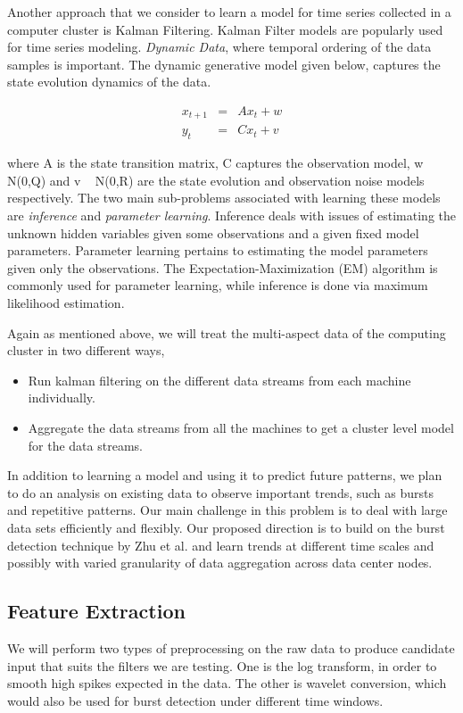 Another approach that we consider to learn a model for time series collected in a computer cluster is Kalman Filtering. Kalman Filter models are popularly used for time series modeling. \emph{Dynamic Data}, where temporal ordering of the data samples is important. The dynamic generative model given below, captures the state evolution dynamics of the data.

\begin{eqnarray}
x_{t+1} &=& Ax_t + w \\
y_t  &=& Cx_t + v
\end{eqnarray}

where A is the state transition matrix, C captures the observation model, w ~ N(0,Q) and v ~ N(0,R) are the state evolution and observation noise models respectively. The two main sub-problems associated with learning these models are \emph{inference} and \emph{parameter learning}. Inference deals with issues of estimating the unknown hidden variables given some observations and a given fixed model parameters. Parameter learning pertains to estimating the model parameters given only the  observations. The Expectation-Maximization (EM) algorithm is commonly used for parameter learning, while inference is done via maximum likelihood estimation.

Again as mentioned above, we will treat the multi-aspect data of the computing cluster in two different ways,

\begin{itemize}
\item Run kalman filtering on the different data streams from each machine individually.
\item Aggregate the data streams from all the machines to get a cluster level model for the data streams.
\end{itemize}

In addition to learning a model and using it to predict future patterns, we plan to do an analysis on existing data to observe important trends, such as bursts and repetitive patterns. Our main challenge in this problem is to deal with large data sets efficiently and flexibly. Our proposed direction is to build on the burst detection technique by Zhu et al. \cite{Zhu2003} and learn trends at different time scales and possibly with varied granularity of data aggregation across data center nodes.

\subsection{Feature Extraction}
\label{sec:method:features}
We will perform two types of preprocessing on the raw data to produce candidate input that suits the filters we are testing. One is the log transform, in order to smooth high spikes expected in the data. The other is wavelet conversion, which would also be used for burst detection under different time windows.

